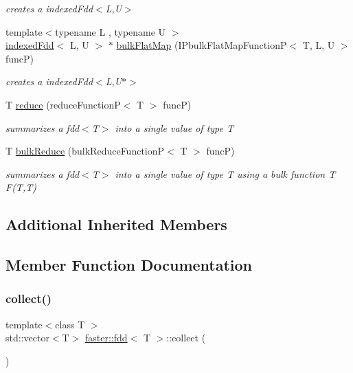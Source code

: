 \begin{DoxyCompactItemize}
\begin{DoxyCompactList}\small\item\em creates a indexed\+Fdd$<$\+L,\+U$>$ \end{DoxyCompactList}\item 
{\footnotesize template$<$typename L , typename U $>$ }\\\hyperlink{classfaster_1_1indexedFdd}{indexed\+Fdd}$<$ L, U $>$ $\ast$ \hyperlink{group__bulk_gaf16d4811371f6dbcfbb717a73a182d48}{bulk\+Flat\+Map} (I\+Pbulk\+Flat\+Map\+FunctionP$<$ T, L, U $>$ funcP)
\begin{DoxyCompactList}\small\item\em creates a indexed\+Fdd$<$\+L,\+U$\ast$$>$ \end{DoxyCompactList}\item 
T \hyperlink{group__reduce_ga1e828ad9a768db382aef2adf878aa1b2}{reduce} (reduce\+FunctionP$<$ T $>$ funcP)
\begin{DoxyCompactList}\small\item\em summarizes a fdd$<$\+T$>$ into a single value of type T \end{DoxyCompactList}\item 
T \hyperlink{group__bulk_ga8f133f23bd653329f44290ebda70bb9b}{bulk\+Reduce} (bulk\+Reduce\+FunctionP$<$ T $>$ funcP)
\begin{DoxyCompactList}\small\item\em summarizes a fdd$<$\+T$>$ into a single value of type T using a bulk function {\itshape T F(\+T,\+T)} \end{DoxyCompactList}\end{DoxyCompactItemize}
\subsection*{Additional Inherited Members}


\subsection{Member Function Documentation}
\hypertarget{classfaster_1_1fdd_a089aa4c91205948dacbc6e6bd6e5bcde}{}\label{classfaster_1_1fdd_a089aa4c91205948dacbc6e6bd6e5bcde} 
\subsubsection{\texorpdfstring{collect()}{collect()}}
{\footnotesize\ttfamily template$<$class T $>$ \\
std\+::vector$<$T$>$ \hyperlink{classfaster_1_1fdd}{faster\+::fdd}$<$ T $>$\+::collect (\begin{DoxyParamCaption}{ }\end{DoxyParamCaption})\hspace{0.3cm}{\ttfamily [inline]}}



